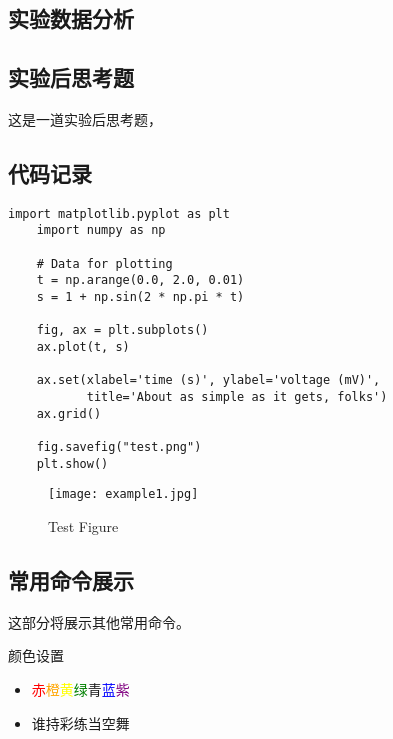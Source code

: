 \documentclass[dvipsnames, svgnames,a4paper,11pt]{article}
\begin{document}
\subsection{实验数据分析}
\subsection{实验后思考题}
\begin{question}
	这是一道实验后思考题，\lipsum[20]
\end{question}

\clearpage
{}



\clearpage
\appendix
\appendixpage
\addappheadtotoc
\subsection{代码记录}
\begin{lstlisting}[style=pythonstyle,caption=代码记录示例]
	import matplotlib.pyplot as plt
	import numpy as np
	
	# Data for plotting
	t = np.arange(0.0, 2.0, 0.01)
	s = 1 + np.sin(2 * np.pi * t)
	
	fig, ax = plt.subplots()
	ax.plot(t, s)
	
	ax.set(xlabel='time (s)', ylabel='voltage (mV)',
		   title='About as simple as it gets, folks')
	ax.grid()
	
	fig.savefig("test.png")
	plt.show()
\end{lstlisting}
\begin{figure}[H]
    \centering
    \texttt{[image: example1.jpg]}
    \caption{Test Figure}
\end{figure}

\clearpage
\subsection{常用命令展示}
这部分将展示其他常用命令。

\begin{tbox}{颜色设置}
\begin{itemize}
	\item  \textcolor{Red}{赤}\textcolor{Orange}{橙}\textcolor{Yellow}{黄}\textcolor{Green}{绿}\textcolor{Emerald}{青}\textcolor{Blue}{蓝}\textcolor{Purple}{紫}
	\item  谁持彩练当空舞
\end{itemize}
\end{tbox}
\end{document}
